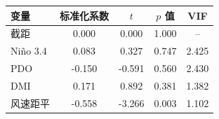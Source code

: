 \begin{tabular}{lcccc}
\hline
变量 & 标准化系数 & $t$ & $p$ 值 & VIF \\
\hline
截距 & 0.000 & 0.000 & 1.000 & -- \\
Ni\~{n}o 3.4 & 0.083 & 0.327 & 0.747 & 2.425 \\
PDO & -0.150 & -0.591 & 0.560 & 2.430 \\
DMI & 0.171 & 0.892 & 0.381 & 1.382 \\
风速距平 & -0.558 & -3.266 & 0.003 & 1.102 \\
\hline
\end{tabular}
